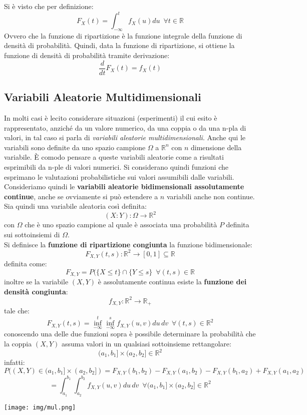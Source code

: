 \documentclass[a4paper,12pt, oneside]{book}
\begin{document}
Si è visto che per definizione:
\[F_X(t)=\int_{-\infty}^tf_X(u)du\,\,\,\forall t\in\mathbb{R}\]
Ovvero che la funzione di ripartizione è la funzione integrale della funzione di densità di probabilità. Quindi, data la funzione di ripartizione, si ottiene la funzione di densità di probabilità tramite derivazione:
\[\frac{d}{dt}F_X(t)=f_X(t)\]
\subsection{Variabili Aleatorie Multidimensionali}
In molti casi è lecito considerare situazioni (esperimenti) il cui esito è rappresentato, anziché da un valore numerico, da una coppia o da una n-pla di valori, in tal caso si parla di \textit{variabili aleatorie multidimensionali}. Anche qui le variabili sono definite da uno spazio campione $\Omega$ a $\mathbb{R}^n$ con $n$ dimensione della variabile. È comodo pensare a queste variabili aleatorie come a risultati esprimibili da n-ple di valori numerici. Si considerano quindi funzioni che esprimano le valutazioni probabilistiche sui valori assumibili dalle variabili.\\
Consideriamo quindi le \textbf{variabili aleatorie bidimensionali assolutamente continue}, anche se ovviamente si può estendere a $n$ variabili anche non continue. \\
Sia quindi una variabile aleatoria così definita:
\[(X:Y):\Omega\to \mathbb{R}^2\]
con $\Omega$ che è uno spazio campione al quale è associata una probabilità $P$ definita sui sottoinsiemi di $\Omega$.\\
Si definisce la \textbf{funzione di ripartizione congiunta} la funzione bidimensionale:
\[F_{X,Y}(t,s):\mathbb{R}^2\to[0,1]\subseteq \mathbb{R}\]
definita come:
\[F_{X,Y}=P(\{X\leq t\}\cap\{Y\leq s\}\,\,\,\forall (t,s)\in \mathbb{R}\]
inoltre se la variabile $(X,Y)$ è assolutamente continua esiste la \textbf{funzione dei densità congiunta}:
\[f_{X,Y}:\mathbb{R}^2\to \mathbb{R}_+\]
tale che:
\[F_{X,Y}(t,s)=\inf_{-\infty}^t\inf_{-\infty}^s f_{X,Y}(u,v)du\,dv\,\,\,\forall (t,s)\in\mathbb{R}^2\]
conoscendo una delle due funzioni sopra è possibile determinare la probabilità che la coppia $(X,Y)$ assuma
valori in un qualsiasi sottoinsieme rettangolare:
\[(a_1,b_1]\times(a_2,b_2]\in\mathbb{R}^2\]
infatti:
\[P((X,Y)\in (a_1,b_1]\times(a_2,b_2])=F_{X,Y}(b_1,b_2)-F_{X,Y}(a_1,b_2)-F_{X,Y}(b_1,a_2)+F_{X,Y}(a_1,a_2)\]
\[=\int_{a_1}^{b_1}\int_{a_2}^{b_2} f_{X,Y}(u,v) du\,dv\,\,\, \forall (a_1,b_1]\times(a_2,b_2]\in\mathbb{R}^2\]
\begin{center}
\texttt{[image: img/mul.png]}
\end{center}
\end{document}
